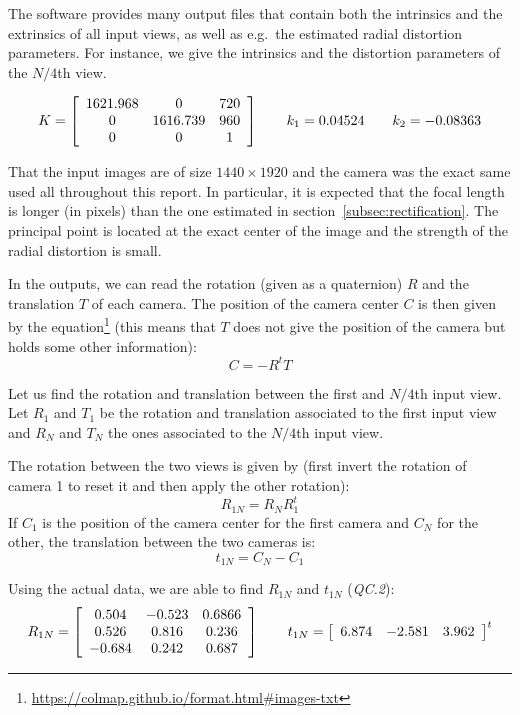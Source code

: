 The software provides many output files that contain both the intrinsics and the extrinsics of all input views, as well
as e.g.\ the estimated radial distortion parameters.
For instance, we give the intrinsics and the distortion parameters of the $N/4$th view.

\[K=\left[\begin{array}{c c c}
              1621.968 & 0 & 720 \\
              0 & 1616.739 & 960\\
              0 & 0 & 1
\end{array}\right]\hspace*{2em}k_1=0.04524\hspace*{2em} k_2=-0.08363\]

That the input images are of size $1440\times 1920$ and the camera was the exact same used all throughout this report.
In particular, it is expected that the focal length is longer (in pixels) than the one estimated in
section~\ref{subsec:rectification}.
The principal point is located at the exact center of the image and the strength of the radial distortion is small.

In the outputs, we can read the rotation (given as a quaternion) $R$ and the translation $T$ of each camera.
The position of the camera center $C$ is then given by the
equation\footnote{\url{https://colmap.github.io/format.html\#images-txt}}
(this means that $T$ does not give the position of the camera but holds some other information):
\[C=-R^t T\]

Let us find the rotation and translation between the first and $N/4$th input view.
Let $R_1$ and $T_1$ be the rotation and translation associated to the first input view and $R_N$ and $T_N$ the ones
associated to the $N/4$th input view.

The rotation between the two views is given by (first invert the rotation of camera 1 to reset it and then apply the
other rotation):
\[R_{1N}=R_N R_1^t\]
If $C_1$ is the position of the camera center for the first camera and $C_N$ for the other, the translation between
the two cameras is:
\[t_{1N}=C_N-C_1\]

Using the actual data, we are able to find $R_{1N}$ and $t_{1N}$ (\textit{QC.2}):
\[R_{1N}=\left[\begin{array}{c c c}
                   0.504 & -0.523 & 0.6866\\
 0.526 & 0.816 & 0.236\\
 -0.684 & 0.242 & 0.687
\end{array}\right]\hspace*{2em} t_{1N}=
\left[\begin{array}{c c c}
     6.874 & -2.581 & 3.962
\end{array}\right]^t\]

